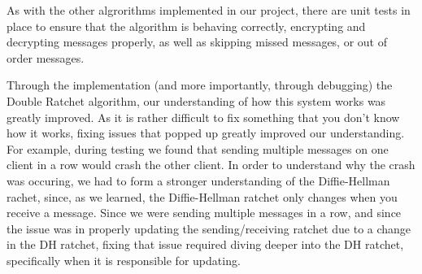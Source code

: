 As with the other algrorithms implemented in our project, there are unit tests 
in place to ensure that the algorithm is behaving correctly, encrypting and decrypting 
messages properly, as well as skipping missed messages, or out of order messages.

Through the implementation (and more importantly, through debugging) the Double Ratchet algorithm, our understanding 
of how this system works was greatly improved. As it is rather difficult to fix something that you don't know how it 
works, fixing issues that popped up greatly improved our understanding. For example, during testing we found that 
sending multiple messages on one client in a row would crash the other client. In order to understand why the crash was occuring,
we had to form a stronger understanding of the Diffie-Hellman rachet, since, as we learned, the Diffie-Hellman ratchet only changes 
when you receive a message. Since we were sending multiple messages in a row, and since the issue was in properly updating the 
sending/receiving ratchet due to a change in the DH ratchet, fixing that issue required diving deeper into the DH ratchet, specifically when
it is responsible for updating.
